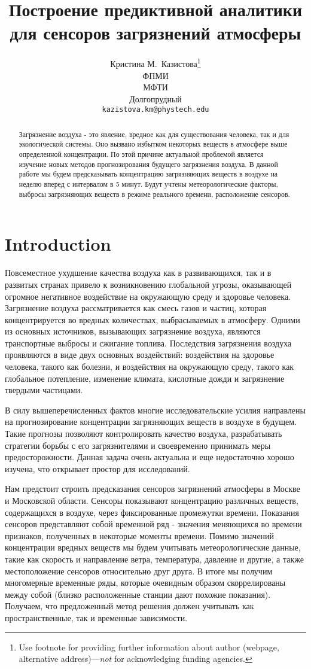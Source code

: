 \documentclass{article}
\title{Построение предиктивной аналитики для сенсоров загрязнений атмосферы}
\author{ Кристина М.~Казистова\thanks{Use footnote for providing further
		information about author (webpage, alternative
		address)---\emph{not} for acknowledging funding agencies.} \\
	ФПМИ\\
	МФТИ\\
	Долгопрудный \\
	\texttt{kazistova.km@phystech.edu} \\
}
\date{}
\begin{document}
\maketitle

\begin{abstract}
Загрязнение воздуха - это явление, вредное как для существования человека, так и для экологической системы. Оно вызвано избытком некоторых веществ в атмосфере выше определенной концентрации. По этой причине актуальной проблемой является изучение новых методов прогнозирования будущего загрязнения воздуха. В данной работе мы будем предсказывать концентрацию загрязняющих веществ в воздухе на неделю вперед с интервалом в 5 минут. Будут учтены метеорологические факторы, выбросы загрязняющих веществ в режиме реального времени, расположение сенсоров. 
\end{abstract}

\section{Introduction}
Повсеместное ухудшение качества воздуха как в развивающихся, так и в развитых странах привело к возникновению глобальной угрозы, оказывающей огромное негативное воздействие на окружающую среду и здоровье человека. Загрязнение воздуха рассматривается как смесь газов и частиц, которая концентрируется во вредных количествах, выбрасываемых в атмосферу. Одними из основных источников, вызывающих загрязнение воздуха, являются транспортные выбросы и сжигание топлива. Последствия загрязнения воздуха проявляются в виде двух основных воздействий: воздействия на здоровье человека, такого как болезни, и воздействия на окружающую среду, такого как глобальное потепление, изменение климата, кислотные дожди и загрязнение твердыми частицами. 

В силу вышеперечисленных фактов многие исследовательские усилия направлены на прогнозирование концентрации загрязняющих веществ в воздухе в будущем. Такие прогнозы позволяют контролировать качество воздуха, разрабатывать стратегии борьбы с его загрязнителями и своевременно принимать меры предосторожности. Данная задача очень актуальна и еще недостаточно хорошо изучена, что открывает простор для исследований. 

Нам предстоит строить предсказания сенсоров загрязнений атмосферы в Москве и Московской области. Сенсоры показывают концентрацию различных веществ, содержащихся в воздухе, через фиксированные промежутки времени. Показания сенсоров представляют собой временной ряд - значения меняющихся во времени признаков, полученных в некоторые моменты времени. Помимо значений концентрации вредных веществ мы будем учитывать метеорологические данные, такие как скорость и направление ветра, температура, давление и другие, а также местоположение сенсоров относительно друг друга. В итоге мы получим многомерные временные ряды, которые очевидным образом скоррелированы между собой (близко расположенные станции дают похожие показания). Получаем, что предложенный метод решения должен учитывать как пространственные, так и временные зависимости. 
\end{document}
